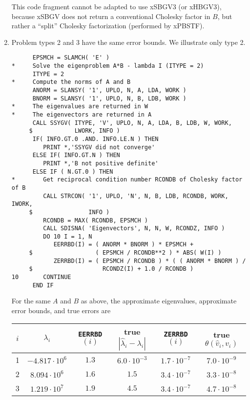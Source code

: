 \begin{enumerate}
This code fragment cannot be adapted to use 
xSBGV3 (or xHBGV3),
because xSBGV does not return a conventional Cholesky factor in $B$,
but rather a ``split'' Cholesky factorization (performed by
xPBSTF).

\item Problem types 2 and 3 have the same error bounds. We illustrate only type 2.

\begin{verbatim}
      EPSMCH = SLAMCH( 'E' )
*     Solve the eigenproblem A*B - lambda I (ITYPE = 2)
      ITYPE = 2
*     Compute the norms of A and B
      ANORM = SLANSY( '1', UPLO, N, A, LDA, WORK )
      BNORM = SLANSY( '1', UPLO, N, B, LDB, WORK )
*     The eigenvalues are returned in W
*     The eigenvectors are returned in A
      CALL SSYGV( ITYPE, 'V', UPLO, N, A, LDA, B, LDB, W, WORK,
     $            LWORK, INFO )
      IF( INFO.GT.0 .AND. INFO.LE.N ) THEN
         PRINT *,'SSYGV did not converge'
      ELSE IF( INFO.GT.N ) THEN
         PRINT *,'B not positive definite'
      ELSE IF ( N.GT.0 ) THEN
*        Get reciprocal condition number RCONDB of Cholesky factor of B
         CALL STRCON( '1', UPLO, 'N', N, B, LDB, RCONDB, WORK, IWORK,
     $                INFO )
         RCONDB = MAX( RCONDB, EPSMCH )
         CALL SDISNA( 'Eigenvectors', N, N, W, RCONDZ, INFO )
         DO 10 I = 1, N
            EERRBD(I) = ( ANORM * BNORM ) * EPSMCH +
     $                  ( EPSMCH / RCONDB**2 ) * ABS( W(I) )
            ZERRBD(I) = ( EPSMCH / RCONDB ) * ( ( ANORM * BNORM ) /
     $                    RCONDZ(I) + 1.0 / RCONDB )
10       CONTINUE
      END IF
\end{verbatim}

For the same $A$ and $B$ as above, the approximate eigenvalues,
approximate error bounds, and true errors are

\begin{center}
\begin{tabular}{||c|c||c|c||c|c||}
\hline
$i$ & $\lambda_i$ &
{\tt EERRBD}$(i)$ & true $| \hat{\lambda}_i - \lambda_i |$ &
{\tt ZERRBD}$(i)$ & true $\theta ( \hat{v}_i , v_i )$ \\ \hline
1 & $-4.817 \cdot 10^6$ & $1.3$ & $6.0 \cdot 10^{-3}$ &
$1.7 \cdot 10^{-7}$ & $7.0 \cdot 10^{-9}$ \\
2 & $8.094 \cdot 10^6$ & $1.6$ & $1.5$ &
$3.4 \cdot 10^{-7}$ & $3.3 \cdot 10^{-8}$ \\
3 & $1.219 \cdot 10^7$ & $1.9$ & $4.5$ &
$3.4 \cdot 10^{-7}$ & $4.7 \cdot 10^{-8}$ \\ \hline
\end{tabular}
\end{center}

\end{enumerate}

